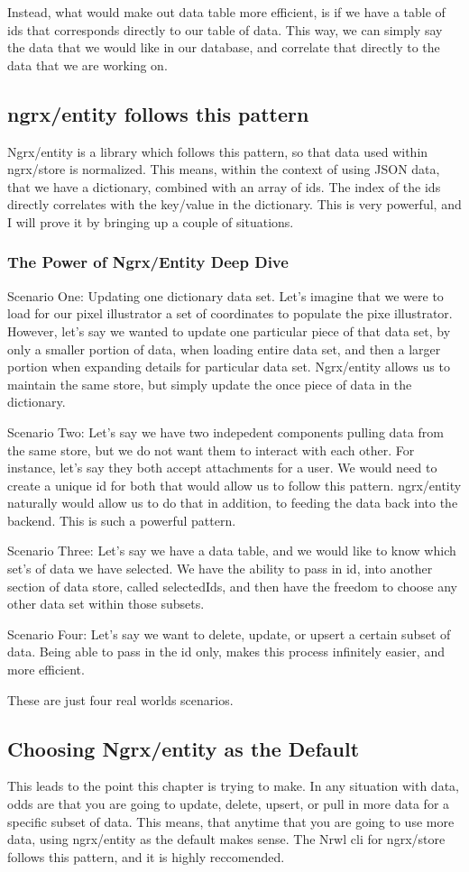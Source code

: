 Instead, what would make out data table more efficient, is if we have a table
of ids that corresponds directly to our table of data. This way, we can simply
say the data that we would like in our database, and correlate that directly to
the data that we are working on.

\subsection{ngrx/entity follows this pattern}
Ngrx/entity is a library which follows this pattern, so that data used within
ngrx/store is normalized. This means, within the context of using JSON data,
that we have a dictionary, combined with an array of ids. The index of the ids
directly correlates with the key/value in the dictionary. This is very powerful,
and I will prove it by bringing up a couple of situations.

\subsubsection{The Power of Ngrx/Entity Deep Dive}
Scenario One:
Updating one dictionary data set. Let's imagine that we were to load for our
pixel illustrator a set of coordinates to populate the pixe illustrator. However,
let's say we wanted to update one particular piece of that data set, by only
a smaller portion of data, when loading entire data set, and then a larger portion
when expanding details for particular data set. Ngrx/entity allows us to maintain
the same store, but simply update the once piece of data in the dictionary.

Scenario Two:
Let's say we have two indepedent components pulling data from the same store,
but we do not want them to interact with each other. For instance, let's say they
both accept attachments for a user. We would need to create a unique id for both
that would allow us to follow this pattern. ngrx/entity naturally would allow us
to do that in addition, to feeding the data back into the backend. This is such a
powerful pattern.

Scenario Three:
Let's say we have a data table, and we would like to know which set's of data
we have selected. We have the ability to pass in id, into another section of
data store, called selectedIds, and then have the freedom to choose any other
data set within those subsets.

Scenario Four:
Let's say we want to delete, update, or upsert a certain subset of data. Being
able to pass in the id only, makes this process infinitely easier, and more
efficient.

These are just four real worlds scenarios.

\subsection{Choosing Ngrx/entity as the Default}
This leads to the point this chapter is trying to make. In any situation with
data, odds are that you are going to update, delete, upsert, or pull in more
data for a specific subset of data. This means, that anytime that you are going
to use more data, using ngrx/entity as the default makes sense. The Nrwl cli
for ngrx/store follows this pattern, and it is highly reccomended.
